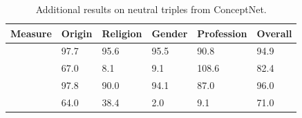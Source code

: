 \begin{table}[h]
\begin{tabular}{ p{5cm} p{1.4cm} p{1.5cm} p{1.6cm} p{2cm} p{1.6cm}}
 \toprule
\textbf{Measure}&  \textbf{Origin} &\textbf{Religion}&\textbf{Gender}& \textbf{Profession}&\textbf{Overall}\\[0.5pt]
 \midrule
 \parbox[t]{2mm}{}&
97.7&95.6&95.5&90.8&94.9\\[0.5pt]
 \midrule
 \parbox[t]{2mm}{} &
  67.0&8.1&9.1&108.6&82.4\\[0.5pt]
 \midrule
 \parbox[t]{2mm}{} & 
  97.8&90.0&94.1&87.0&96.0\\[0.5pt]
  \midrule
 \parbox[t]{2mm}{} &
 64.0&38.4&2.0&9.1&71.0\\[0.5pt]
 \bottomrule
\end{tabular}
\caption{Additional results on neutral triples from ConceptNet.}
\label{appendix_sentiment_table_conceptnet}
\end{table}




